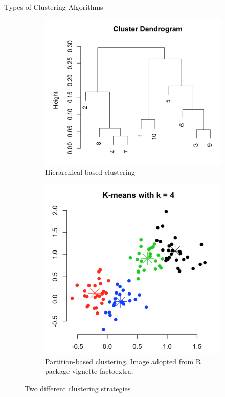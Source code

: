 \documentclass[10pt]{beamer}
\begin{document}
\begin{frame}{Types of Clustering Algorithms}
    \begin{figure}
    \centering
        \begin{subfigure}{.5\textwidth}
          \centering
          \includegraphics[width=1\linewidth]{hclust.png}
          \caption{Hierarchical-based clustering}
          \label{fig:sub1}
        \end{subfigure}
       \begin{subfigure}{.5\textwidth}
          \centering
          \includegraphics[width=1\linewidth]{partition.png}
          \caption{Partition-based clustering. Image adopted from R package vignette factoextra.}
          \label{fig:sub2}
        \end{subfigure}
    \caption{Two different clustering strategies}
    \label{fig:test}
    \end{figure}
\end{frame}
\end{document}
